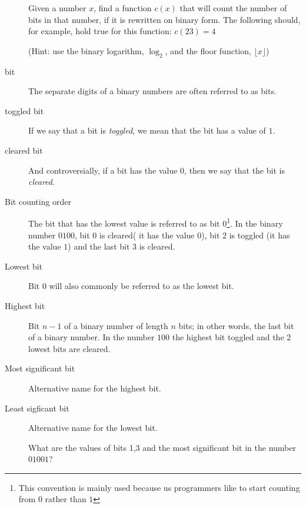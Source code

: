 \begin{description}
  \begin{Exercise}[label={count-bits-func}]
    Given a number $x$, find a function $c(x)$ that will count the
    number of bits in that number, if it is rewritten on binary
    form. The following should, for example, hold true for this
    function: $c(23) = 4$

    (Hint: use the binary logarithm, $\log_2$, and the floor function,
    $\lfloor x \rfloor$)

  \end{Exercise}

\item[bit] The separate digits of a binary numbers are often referred
  to as bits.

\item[toggled bit] If we say that a bit is \textit{toggled}, we mean that
  the bit has a value of $1$.

\item[cleared bit] And controversially, if a bit has the value
  $0$, then we say that the bit is \textit{cleared}.

\item[Bit counting order] The bit that has the lowest value is
  referred to as bit 0\footnote{This convention is mainly used because
    us programmers like to start counting from $0$ rather than $1$}.
  In the binary number $0100$, bit 0 is cleared( it has the value
  $0$), bit 2 is toggled (it has the value $1$) and the last bit 3 is
  cleared.

\item[Lowest bit] Bit 0 will also commonly be referred to as the
  lowest bit.

\item[Highest bit] Bit $n - 1$ of a binary number of length $n$ bits;
  in other words, the last bit of a binary number. In the number $100$
  the highest bit toggled and the 2 lowest bits are cleared.

\item[Most significant bit] Alternative name for the highest bit.

\item[Least sigficant bit] Alternative name for the lowest bit.

  \begin{Exercise}[label={bits-value-order}]
    What are the values of bits 1,3 and the most significant bit in the
    number $01001$?

  \end{Exercise}


\end{description}
